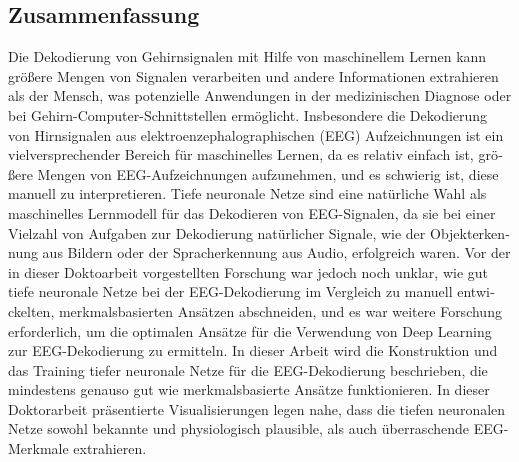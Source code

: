 \begin{otherlanguage}{ngerman}
\chapter*{Zusammenfassung}
Die Dekodierung von Gehirnsignalen mit Hilfe von maschinellem Lernen kann größere Mengen von Signalen verarbeiten und andere Informationen extrahieren als der Mensch, was potenzielle Anwendungen in der medizinischen Diagnose oder bei Gehirn-Computer-Schnittstellen ermöglicht. Insbesondere die Dekodierung von Hirnsignalen aus elektroenzephalographischen (EEG) Aufzeichnungen ist ein vielversprechender Bereich für maschinelles Lernen, da es relativ einfach ist, größere Mengen von EEG-Aufzeichnungen aufzunehmen, und es schwierig ist, diese manuell zu interpretieren. Tiefe neuronale Netze sind eine natürliche Wahl als maschinelles Lernmodell für das Dekodieren von EEG-Signalen, da sie bei einer Vielzahl von Aufgaben zur Dekodierung natürlicher Signale, wie der Objekterkennung aus Bildern oder der Spracherkennung aus Audio, erfolgreich waren. Vor der in dieser Doktoarbeit vorgestellten Forschung war jedoch noch unklar, wie gut tiefe neuronale Netze bei der EEG-Dekodierung im Vergleich zu manuell entwickelten, merkmalsbasierten Ansätzen abschneiden, und es war weitere Forschung erforderlich, um die optimalen Ansätze für die Verwendung von Deep Learning zur EEG-Dekodierung zu ermitteln. In dieser Arbeit wird die Konstruktion und das Training tiefer neuronale Netze für die EEG-Dekodierung beschrieben, die mindestens genauso gut wie merkmalsbasierte Ansätze funktionieren. In dieser Doktorarbeit präsentierte Visualisierungen legen nahe, dass die tiefen neuronalen Netze sowohl bekannte und physiologisch plausible, als auch überraschende EEG-Merkmale extrahieren.
\end{otherlanguage}

\endgroup

\vfill
